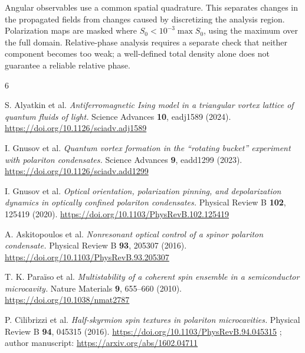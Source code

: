 \documentclass[12pt,a4paper]{article}
\begin{document}
Angular observables use a common spatial quadrature. This separates changes in the propagated fields from changes caused by discretizing the analysis region. Polarization maps are masked where \(S_0<10^{-3}\max S_0\), using the maximum over the full domain. Relative-phase analysis requires a separate check that neither component becomes too weak; a well-defined total density alone does not guarantee a reliable relative phase.

\clearpage\begin{thebibliography}{6}

 S. Alyatkin et al. \emph{Antiferromagnetic Ising model in a triangular vortex lattice of quantum fluids of light.} Science Advances \textbf{10}, eadj1589 (2024). \url{https://doi.org/10.1126/sciadv.adj1589}

 I. Gnusov et al. \emph{Quantum vortex formation in the ``rotating bucket'' experiment with polariton condensates.} Science Advances \textbf{9}, eadd1299 (2023). \url{https://doi.org/10.1126/sciadv.add1299}

 I. Gnusov et al. \emph{Optical orientation, polarization pinning, and depolarization dynamics in optically confined polariton condensates.} Physical Review B \textbf{102}, 125419 (2020). \url{https://doi.org/10.1103/PhysRevB.102.125419}

 A. Askitopoulos et al. \emph{Nonresonant optical control of a spinor polariton condensate.} Physical Review B \textbf{93}, 205307 (2016). \url{https://doi.org/10.1103/PhysRevB.93.205307}

 T. K. Paraïso et al. \emph{Multistability of a coherent spin ensemble in a semiconductor microcavity.} Nature Materials \textbf{9}, 655--660 (2010). \url{https://doi.org/10.1038/nmat2787}

 P. Cilibrizzi et al. \emph{Half-skyrmion spin textures in polariton microcavities.} Physical Review B \textbf{94}, 045315 (2016). \url{https://doi.org/10.1103/PhysRevB.94.045315} ; author manuscript: \url{https://arxiv.org/abs/1602.04711}


\end{thebibliography}
\end{document}
